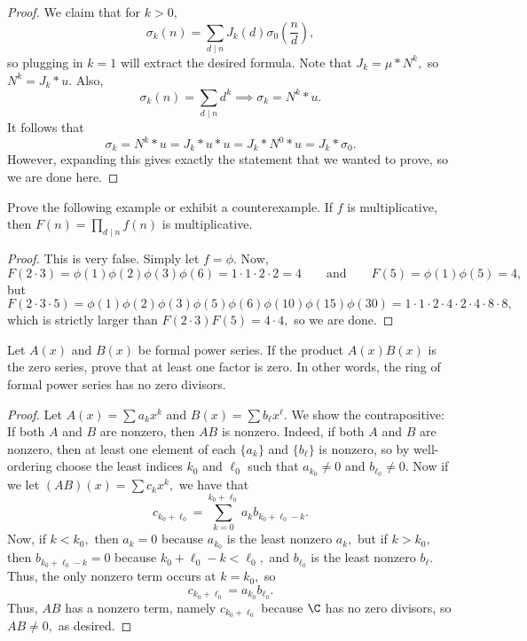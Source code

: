 \begin{proof}
We claim that for $k>0,$
\[\sigma_k(n)=\sum_{d\mid n}J_k(d)\sigma_0\left(\frac nd\right),\]
so plugging in $k=1$ will extract the desired formula. Note that $J_k=\mu*N^k,$ so $N^k=J_k*u$. Also,
\[\sigma_k(n)=\sum_{d\mid n}d^k\implies\sigma_k=N^k*u.\]
It follows that
\[\sigma_k=N^k*u=J_k*u*u=J_k*N^0*u=J_k*\sigma_0.\]
However, expanding this gives exactly the statement that we wanted to prove, so we are done here.
\end{proof}

\begin{exercise}
Prove the following example or exhibit a counterexample. If $f$ is multiplicative, then $F(n)=\prod_{d\mid n}f(n)$ is multiplicative.
\end{exercise}

\begin{proof}
This is very false. Simply let $f=\phi.$ Now,
\[F(2\cdot3)=\phi(1)\phi(2)\phi(3)\phi(6)=1\cdot1\cdot2\cdot2=4\qquad\text{and}\qquad F(5)=\phi(1)\phi(5)=4,\]
but
\[F(2\cdot3\cdot5)=\phi(1)\phi(2)\phi(3)\phi(5)\phi(6)\phi(10)\phi(15)\phi(30)=1\cdot1\cdot2\cdot4\cdot2\cdot4\cdot8\cdot8,\]
which is strictly larger than $F(2\cdot3)F(5)=4\cdot4,$ so we are done.
\end{proof}

\begin{exercise}
Let $A(x)$ and $B(x)$ be formal power series. If the product $A(x)B(x)$ is the zero series, prove that at least one factor is zero. In other words, the ring of formal power series has no zero divisors.
\end{exercise}

\begin{proof}
Let $A(x)=\sum a_kx^k$ and $B(x)=\sum b_\ell x^\ell.$ We show the contrapositive: If both $A$ and $B$ are nonzero, then $AB$ is nonzero. Indeed, if both $A$ and $B$ are nonzero, then at least one element of each $\{a_k\}$ and $\{b_\ell\}$ is nonzero, so by well-ordering choose the least indices $k_0$ and $\ell_0$ such that $a_{k_0}\ne0$ and $b_{\ell_0}\ne0.$ Now if we let $(AB)(x)=\sum c_kx^k,$ we have that
\[c_{k_0+\ell_0}=\sum_{k=0}^{k_0+\ell_0}a_kb_{k_0+\ell_0-k}.\]
Now, if $k<k_0,$ then $a_k=0$ because $a_{k_0}$ is the least nonzero $a_k,$ but if $k>k_0,$ then $b_{k_0+\ell_0-k}=0$ because $k_0+\ell_0-k<\ell_0,$ and $b_{\ell_0}$ is the least nonzero $b_\ell.$ Thus, the only nonzero term occurs at $k=k_0,$ so
\[c_{k_0+\ell_0}=a_{k_0}b_{\ell_0}.\]
Thus, $AB$ has a nonzero term, namely $c_{k_0+\ell_0}$ because $\C$ has no zero divisors, so $AB\ne0,$ as desired.
\end{proof}

